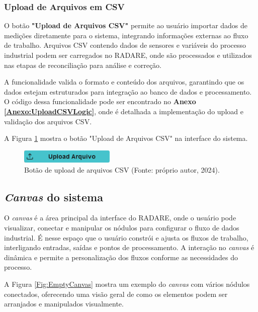 \subsubsection{Upload de Arquivos em CSV}

O botão \textbf{"Upload de Arquivos CSV"} permite ao usuário importar dados de medições diretamente para o sistema, integrando informações externas ao fluxo de trabalho. Arquivos CSV contendo dados de sensores e variáveis do processo industrial podem ser carregados no RADARE, onde são processados e utilizados nas etapas de reconciliação para análise e correção.

A funcionalidade valida o formato e conteúdo dos arquivos, garantindo que os dados estejam estruturados para integração ao banco de dados e processamento. O código dessa funcionalidade pode ser encontrado no \textbf{Anexo \ref{Anexo:UploadCSVLogic}}, onde é detalhada a implementação do upload e validação dos arquivos CSV.

A Figura \ref{Fig:UploadCSVButton} mostra o botão "Upload de Arquivos CSV" na interface do sistema.

\begin{figure}[htbp]
    \centering
    \includegraphics[width=0.4\textwidth]{figuras/upload-csv-button.png}
    \caption{Botão de upload de arquivos CSV (Fonte: próprio autor, 2024).}
    \label{Fig:UploadCSVButton}
\end{figure}

\subsection{\textit{Canvas} do sistema}

O \textit{canvas} é a área principal da interface do RADARE, onde o usuário pode visualizar, conectar e manipular os nódulos para configurar o fluxo de dados industrial. É nesse espaço que o usuário constrói e ajusta os fluxos de trabalho, interligando entradas, saídas e pontos de processamento. A interação no \textit{canvas} é dinâmica e permite a personalização dos fluxos conforme as necessidades do processo.

A Figura \ref{Fig:EmptyCanvas} mostra um exemplo do \textit{canvas} com vários nódulos conectados, oferecendo uma visão geral de como os elementos podem ser arranjados e manipulados visualmente.

